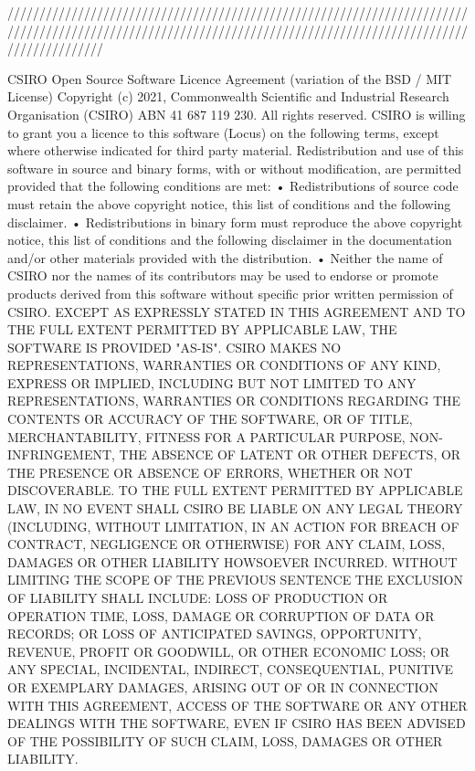 ///////////////////////////////////////////////////////////////////////////////////////////////////////////////////////////////////////////////////////////////

CSIRO Open Source Software Licence Agreement (variation of the BSD / MIT License)
Copyright (c) 2021, Commonwealth Scientific and Industrial Research Organisation (CSIRO) ABN 41 687 119 230.
All rights reserved. CSIRO is willing to grant you a licence to this software (Locus) on the following terms, except where otherwise indicated for third party material.
Redistribution and use of this software in source and binary forms, with or without modification, are permitted provided that the following conditions are met:
•	Redistributions of source code must retain the above copyright notice, this list of conditions and the following disclaimer.
•	Redistributions in binary form must reproduce the above copyright notice, this list of conditions and the following disclaimer in the documentation and/or other materials provided with the distribution.
•	Neither the name of CSIRO nor the names of its contributors may be used to endorse or promote products derived from this software without specific prior written permission of CSIRO.
EXCEPT AS EXPRESSLY STATED IN THIS AGREEMENT AND TO THE FULL EXTENT PERMITTED BY APPLICABLE LAW, THE SOFTWARE IS PROVIDED "AS-IS". CSIRO MAKES NO REPRESENTATIONS, WARRANTIES OR CONDITIONS OF ANY KIND, EXPRESS OR IMPLIED, INCLUDING BUT NOT LIMITED TO ANY REPRESENTATIONS, WARRANTIES OR CONDITIONS REGARDING THE CONTENTS OR ACCURACY OF THE SOFTWARE, OR OF TITLE, MERCHANTABILITY, FITNESS FOR A PARTICULAR PURPOSE, NON-INFRINGEMENT, THE ABSENCE OF LATENT OR OTHER DEFECTS, OR THE PRESENCE OR ABSENCE OF ERRORS, WHETHER OR NOT DISCOVERABLE.
TO THE FULL EXTENT PERMITTED BY APPLICABLE LAW, IN NO EVENT SHALL CSIRO BE LIABLE ON ANY LEGAL THEORY (INCLUDING, WITHOUT LIMITATION, IN AN ACTION FOR BREACH OF CONTRACT, NEGLIGENCE OR OTHERWISE) FOR ANY CLAIM, LOSS, DAMAGES OR OTHER LIABILITY HOWSOEVER INCURRED.  WITHOUT LIMITING THE SCOPE OF THE PREVIOUS SENTENCE THE EXCLUSION OF LIABILITY SHALL INCLUDE: LOSS OF PRODUCTION OR OPERATION TIME, LOSS, DAMAGE OR CORRUPTION OF DATA OR RECORDS; OR LOSS OF ANTICIPATED SAVINGS, OPPORTUNITY, REVENUE, PROFIT OR GOODWILL, OR OTHER ECONOMIC LOSS; OR ANY SPECIAL, INCIDENTAL, INDIRECT, CONSEQUENTIAL, PUNITIVE OR EXEMPLARY DAMAGES, ARISING OUT OF OR IN CONNECTION WITH THIS AGREEMENT, ACCESS OF THE SOFTWARE OR ANY OTHER DEALINGS WITH THE SOFTWARE, EVEN IF CSIRO HAS BEEN ADVISED OF THE POSSIBILITY OF SUCH CLAIM, LOSS, DAMAGES OR OTHER LIABILITY.
